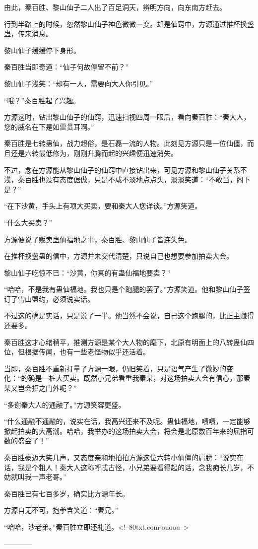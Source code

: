 \begin{this_body}
由此，秦百胜、黎山仙子二人出了百足洞天，辨明方向，向东南方赶去。

行到半路上的时候，忽然黎山仙子神色微微一变。却是仙窍中，方源通过推杯换盏蛊，传来消息。

黎山仙子缓缓停下身形。

秦百胜当即奇道：“仙子何故停留不前？”

黎山仙子浅笑：“却有一人，需要向大人你引见。”

“哦？”秦百胜起了兴趣。

方源这时，钻出黎山仙子的仙窍，迅速扫视四周一眼后，看向秦百胜：“秦大人，您的威名在下是如雷贯耳啊。”

秦百胜是七转蛊仙，战力超俗，是石磊一流的人物。此刻见方源只是一位仙僵，而且还是六转最低修为，刚刚升腾而起的兴趣便迅速消失。

不过，念在方源能从黎山仙子的仙窍中直接钻出来，可见方源和黎山仙子关系不浅，秦百胜也没有态度倨傲，只是不咸不淡地点点头，淡淡笑道：“不敢当，阁下是？”

“在下沙黄，手头上有项大买卖，要和秦大人您详谈。”方源笑道。

“什么大买卖？”

方源便说了贩卖蛊仙福地之事，秦百胜、黎山仙子皆连失色。

在推杯换盏蛊的信中，方源并未交代清楚，只说自己也想要参加拍卖大会。

黎山仙子吃惊不已：“沙黄，你真的有蛊仙福地要卖？”

“哈哈，不是我有蛊仙福地。我也只是个跑腿的罢了。”方源笑道。他和黎山仙子签订了雪山盟约，必须说实话。

不过这的确是实话，只是说了一半。他当然不会说，自己这个跑腿的，比正主赚得还要多。

秦百胜这才心绪稍平，推测方源是某个大人物的麾下，北原有明面上的八转蛊仙四位，但根据传闻，也有一些老怪物似乎还活着。

当即，秦百胜不重新打量了方源一眼，仍旧笑着，只是语气产生了微妙的变化：“的确是一桩大买卖。既然小兄弟看重我秦某，对这场拍卖大会有信心，那秦某又岂会拒之门外呢？”

“多谢秦大人的通融了。”方源笑容更盛。

“什么通融不通融的，说实在话，我高兴还来不及呢。蛊仙福地，啧啧，一定能够掀起拍卖的大高潮。哈哈，我举办的这场拍卖大会，将会是北原数百年来的屈指可数的盛会了！”

秦百胜豪迈大笑几声，又态度亲和地拍拍方源这位六转小仙僵的肩膀：“说实在话，我是个粗人！秦大人这称呼忒古怪，小兄弟要看得起的话，念我痴长几岁，不妨就叫我一声老哥。”

秦百胜已有七百多岁，确实比方源年长。

方源自无不可，抱拳含笑道：“秦兄。”

“哈哈，沙老弟。”秦百胜立即还礼道。<!--80txt.com-ouoou-->

------------

\end{this_body}

